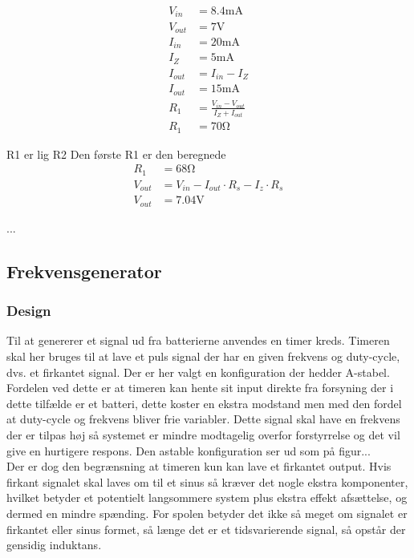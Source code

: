 	\begin{align}
	V_{in} & = 8.4 \si{\milli\ampere} \nonumber \\
	V_{out} & = 7 \si{\volt} \nonumber \\
	I_{in} & = 20\si{\milli\ampere} \nonumber \\
	I_Z & = 5 \si{\milli\ampere} \nonumber \\
	I_{out} & = I_{in} - I_Z \\
	I_{out} & = 15 \si{\milli\ampere} \nonumber \\
	R_1 & = \frac{V_{in} - V_{out}}{I_Z + I_{out}} \label{eq:RegulatorModstand} \\
	R_1 & = 70 \si{\ohm} \nonumber \label{eq:RegulatorModstandBeregnet}
	\end{align}
	
	R1 er lig R2
	Den første R1 er den beregnede
	\begin{align}
	R_1 & = 68 \si{\ohm} \nonumber \\
	V_{out} & = V_{in} - I_{out} \cdot R_s - I_z \cdot R_s \\
	V_{out} & = 7.04 \si{\volt} \label{eq:RegulatorBeregnetPotentiale} 
	\end{align}
	



...

\subsection{Frekvensgenerator}
\subsubsection{Design}
Til at genererer et signal ud fra batterierne anvendes en timer kreds. 
Timeren skal her bruges til at lave et puls signal der har en given frekvens og duty-cycle, dvs. et firkantet signal. 
Der er her valgt en konfiguration der hedder A-stabel. 
Fordelen ved dette er at timeren kan hente sit input direkte fra forsyning der i dette tilfælde er et batteri, dette koster en ekstra modstand men med den fordel at duty-cycle og frekvens bliver frie variabler. 
Dette signal skal have en frekvens der er tilpas høj så systemet er mindre modtagelig overfor forstyrrelse og det vil give en hurtigere respons. 
Den astable konfiguration ser ud som på figur...\\

Der er dog den begrænsning at timeren kun kan lave et firkantet output. 
Hvis firkant signalet skal laves om til et sinus så kræver det nogle ekstra komponenter, hvilket betyder et potentielt langsommere system plus ekstra effekt afsættelse, og dermed en mindre spænding. For spolen betyder det ikke så meget om signalet er firkantet eller sinus formet, så længe det er et tidsvarierende signal, så opstår der gensidig induktans.\\

